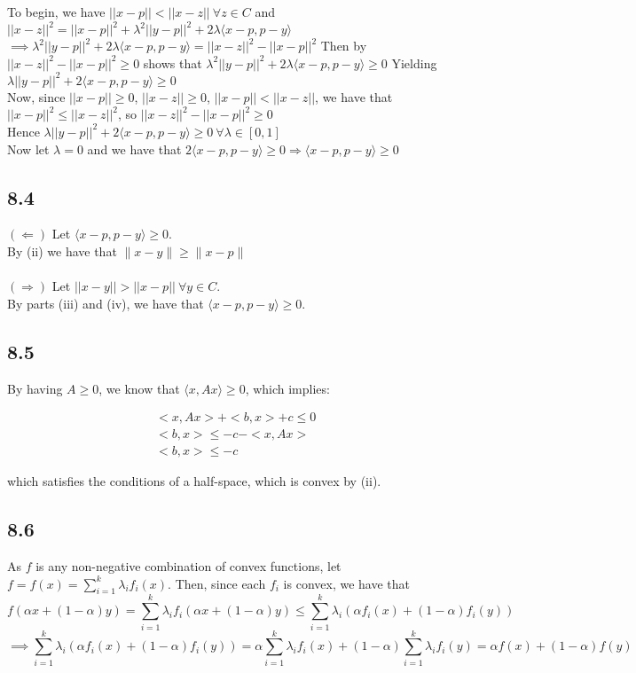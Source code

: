\documentclass[letterpaper,12pt]{article}
\theoremstyle{definition}
\begin{document}
To begin, we have $||x-p|| < ||x-z||~ \forall z\in C$
and $||x-z||^2 = ||x-p||^2 + \lambda^2||y-p||^2 +2\lambda \langle x-p,p-y\rangle$
 $\implies \lambda^2||y-p||^2 +2\lambda \langle x-p,p-y\rangle = ||x-z||^2 - ||x-p||^2$
Then by$||x-z||^2 - ||x-p||^2 \geq 0$ shows that $\lambda^2||y-p||^2 +2\lambda \langle x-p,p-y\rangle \geq 0 $
Yielding $\lambda||y-p||^2 +2 \langle x-p,p-y\rangle \geq 0$\\
Now, since $||x-p||\geq 0$, $||x-z|| \geq 0$, $||x-p||<||x-z||$,
we have that $||x-p||^2\leq ||x-z||^2$,
so $||x-z||^2 - ||x-p||^2 \geq 0$\\
Hence $\lambda||y-p||^2 +2 \langle x-p,p-y\rangle \geq 0 ~\forall \lambda \in [0,1]$\\ Now let $\lambda = 0$ and we have that $2 \langle x-p,p-y\rangle \geq 0 \Rightarrow \langle x-p,p-y\rangle \geq 0$ 

\subsection*{8.4}


$(\Leftarrow)$ Let $\langle x-p,p-y \rangle \geq 0$.\\
By (ii) we have that $\| x - y \| \geq \| x - p \|$\\ \\
$(\Rightarrow)$ Let $||x-y|| > ||x-p||~ \forall y \in C$.\\
By parts (iii) and (iv), we have that $\langle x-p,p-y \rangle \geq 0$.


\subsection*{8.5}


By having $A \geq 0$, we know that $\langle x,Ax \rangle \geq 0$, which implies: 

\begin{align*}
& <x,Ax> + <b,x> +c \leq 0 \\
& <b,x> \leq -c - <x,Ax> \\
& <b,x> \leq -c
\end{align*} 

which satisfies the conditions of a half-space, which is convex by (ii).

\subsection*{8.6}
As $f$ is any non-negative combination of convex functions, let $f = f(x) = \sum_{i=1}^{k}\lambda_i f_i(x)$. 
Then, since each $f_i$ is convex, we have that
\[ f(\alpha x + (1-\alpha)y) = \sum_{i=1}^{k}\lambda_i f_i(\alpha x + (1-\alpha)y) \leq \sum_{i=1}^{k}\lambda_i(\alpha f_i(x)+(1-\alpha)f_i(y))\]
\[\implies \sum_{i=1}^{k}\lambda_i(\alpha f_i(x)+(1-\alpha)f_i(y)) = \alpha\sum_{i=1}^{k}\lambda_i f_i(x)+(1-\alpha)\sum_{i=1}^{k}\lambda_i f_i(y) 
 = \alpha f(x) + (1-\alpha)f(y) \]
\end{document}
